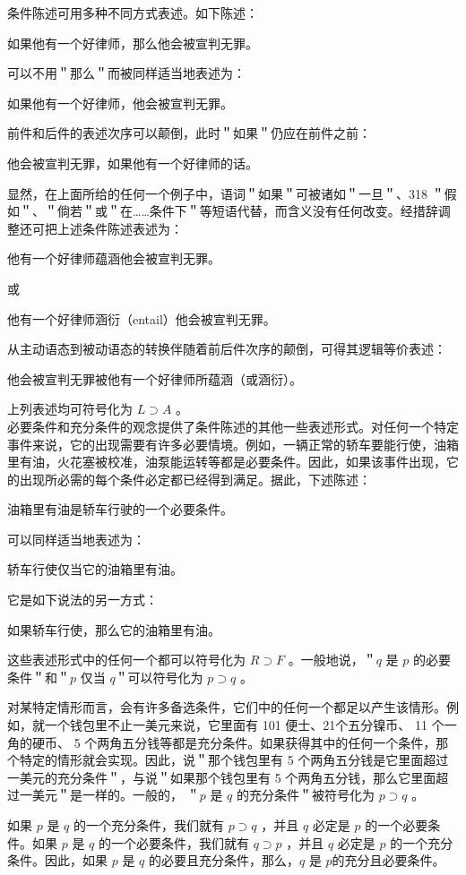 条件陈述可用多种不同方式表述。如下陈述：

如果他有一个好律师，那么他会被宣判无罪。

可以不用＂那么＂而被同样适当地表述为：

如果他有一个好律师，他会被宣判无罪。

前件和后件的表述次序可以颠倒，此时＂如果＂仍应在前件之前：

他会被宣判无罪，如果他有一个好律师的话。

显然，在上面所给的任何一个例子中，语词＂如果＂可被诸如＂一旦＂、318 ＂假如＂、＂倘若＂或＂在……条件下＂等短语代替，而含义没有任何改变。经措辞调整还可把上述条件陈述表述为：

他有一个好律师蕴涵他会被宣判无罪。

或

他有一个好律师涵衍（entail）他会被宣判无罪。

从主动语态到被动语态的转换伴随着前后件次序的颠倒，可得其逻辑等价表述：

他会被宣判无罪被他有一个好律师所蕴涵（或涵衍）。

上列表述均可符号化为 $L \supset A$ 。\\
必要条件和充分条件的观念提供了条件陈述的其他一些表述形式。对任何一个特定事件来说，它的出现需要有许多必要情境。例如，一辆正常的轿车要能行使，油箱里有油，火花塞被校准，油泵能运转等都是必要条件。因此，如果该事件出现，它的出现所必需的每个条件必定都已经得到满足。据此，下述陈述：

油箱里有油是轿车行驶的一个必要条件。

可以同样适当地表述为：

轿车行使仅当它的油箱里有油。

它是如下说法的另一方式：

如果轿车行使，那么它的油箱里有油。

这些表述形式中的任何一个都可以符号化为 $R \supset F$ 。一般地说，＂$q$ 是 $p$ 的必要条件＂和＂$p$ 仅当 $q$＂可以符号化为 $p \supset q$ 。

对某特定情形而言，会有许多备选条件，它们中的任何一个都足以产生该情形。例如，就一个钱包里不止一美元来说，它里面有 101 便士、21个五分镍币、 11 个一角的硬币、 5 个两角五分钱等都是充分条件。如果获得其中的任何一个条件，那个特定的情形就会实现。因此，说＂那个钱包里有 5 个两角五分钱是它里面超过一美元的充分条件＂，与说＂如果那个钱包里有 5 个两角五分钱，那么它里面超过一美元＂是一样的。一般的， ＂$p$ 是 $q$ 的充分条件＂被符号化为 $p \supset q$ 。

如果 $p$ 是 $q$ 的一个充分条件，我们就有 $p \supset q$ ，并且 $q$ 必定是 $p$ 的一个必要条件。如果 $p$ 是 $q$ 的一个必要条件，我们就有 $q \supset p$ ，并且 $q$ 必定是 $p$ 的一个充分条件。因此，如果 $p$ 是 $q$ 的必要且充分条件，那么，$q$ 是 $p$的充分且必要条件。

